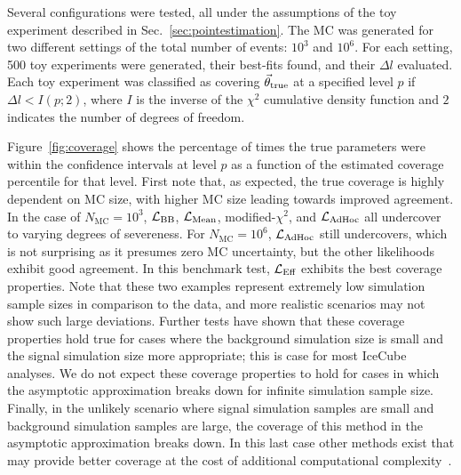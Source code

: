 Several configurations were tested, all under the assumptions of the toy experiment described in Sec.~\ref{sec:pointestimation}.
The MC was generated for two different settings of the total number of events: $10^3$ and $10^6$.
For each setting, 500 toy experiments were generated, their best-fits found, and their $\Delta l$ evaluated.
Each toy experiment was classified as covering $\vec{\theta}_{\rm true}$ at a specified level $p$ if $\Delta l < I(p;2)$, where $I$ is the inverse of the $\chi^2$ cumulative density function and $2$ indicates the number of degrees of freedom.

Figure~\ref{fig:coverage} shows the percentage of times the true parameters were within the confidence intervals at level $p$ as a function of the estimated coverage percentile for that level.
First note that, as expected, the true coverage is highly dependent on MC size, with higher MC size leading towards improved agreement.
In the case of $N_\mathrm{MC}=10^3$, $\mathcal{L}_{\textmd{BB}}$, $\mathcal{L}_{\textmd{Mean}}$, modified-$\chi^2$, and $\mathcal{L}_{\textmd{AdHoc}}$ all undercover to varying degrees of severeness.
For $N_\mathrm{MC}=10^6$, $\mathcal{L}_{\textmd{AdHoc}}$ still undercovers, which is not surprising as it presumes zero MC uncertainty, but the other likelihoods exhibit good agreement.
In this benchmark test, $\mathcal{L}_\textmd{Eff}$ exhibits the best coverage properties.
Note that these two examples represent extremely low simulation sample sizes in comparison to the data, and more realistic scenarios may not show such large deviations.
Further tests have shown that these coverage properties hold true for cases where the background simulation size is small and the signal simulation size more appropriate; this is case for most IceCube analyses.
We do not expect these coverage properties to hold for cases in which the asymptotic approximation breaks down for infinite simulation sample size.
Finally, in the unlikely scenario where signal simulation samples are small and background simulation samples are large, the coverage of this method in the asymptotic approximation breaks down.
In this last case other methods exist that may provide better coverage at the cost of additional computational complexity~\cite{Glusenkamp:2019uir}.

